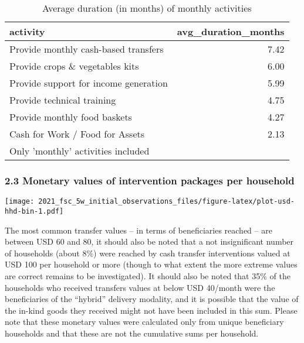 \documentclass[
]{article}
\begin{document}
\begin{table}

\caption{\label{tab:table-avg-duration-activities}Average duration (in months) of monthly activities}
\begin{tabular}[t]{l|r}
\hline
activity & avg\_duration\_months\\
\hline
Provide monthly cash-based transfers & 7.42\\
\hline
Provide crops \& vegetables kits & 6.00\\
\hline
Provide support for income generation & 5.99\\
\hline
Provide technical training & 4.75\\
\hline
Provide monthly food baskets & 4.27\\
\hline
Cash for Work / Food for Assets & 2.13\\
\hline
\multicolumn{2}{l}{\rule{0pt}{1em}Only 'monthly' activities included}\\
\end{tabular}
\end{table}

\hypertarget{monetary-values-of-intervention-packages-per-household}{%
\subsubsection{2.3 Monetary values of intervention packages per
household}\label{monetary-values-of-intervention-packages-per-household}}

\texttt{[image: 2021\_fsc\_5w\_initial\_observations\_files/figure-latex/plot-usd-hhd-bin-1.pdf]}

The most common transfer values -- in terms of beneficiaries reached --
are between USD 60 and 80, it should also be noted that a not
insignificant number of households (about 8\%) were reached by cash
transfer interventions valued at USD 100 per household or more (though
to what extent the more extreme values are correct remains to be
investigated). It should also be noted that 35\% of the households who
received transfers values at below USD 40/month were the beneficiaries
of the ``hybrid'' delivery modality, and it is possible that the value
of the in-kind goods they received might not have been included in this
sum. Please note that these monetary values were calculated only from
unique beneficiary households and that these are not the cumulative sums
per household.
\end{document}
